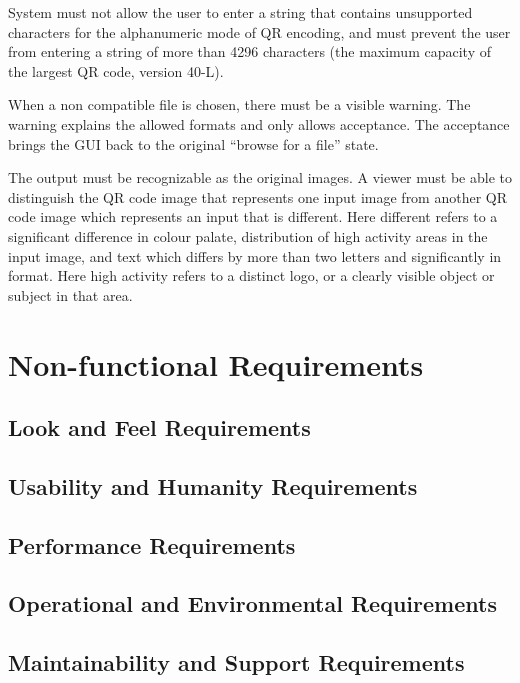 \documentclass[12pt, titlepage]{article}
\begin{document}
	System must not allow the user to enter a string that contains unsupported 
	characters for the alphanumeric mode of QR encoding, and must prevent the 
	user from entering a string of more than 4296 characters (the maximum 
	capacity of the largest QR code, version 40-L).
		
	When a non compatible file is chosen, there must be a visible warning. The 
	warning explains the allowed formats and only allows acceptance. The 
	acceptance brings the GUI back to the original “browse for a file” state.
	
	The output must be recognizable as the original images. A viewer must be 
	able to distinguish the QR code image that represents one input image from 
	another QR code image which represents an input that is different. Here 
	different refers to a significant difference in colour palate, distribution 
	of high activity areas in the input image, and text which differs by more 
	than two letters and significantly in format. Here high activity refers to 
	a distinct logo, or a clearly visible object or subject in that area.
	
	

\section{Non-functional Requirements}

\subsection{Look and Feel Requirements}

\subsection{Usability and Humanity Requirements}

\subsection{Performance Requirements}

\subsection{Operational and Environmental Requirements}

\subsection{Maintainability and Support Requirements}
\end{document}
